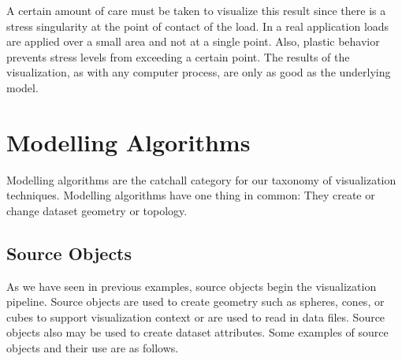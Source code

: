 A certain amount of care must be taken to visualize this result since there is a stress singularity at the point of contact of the load. In a real application loads are applied over a small area and not at a single point. Also, plastic behavior prevents stress levels from exceeding a certain point. The results of the visualization, as with any computer process, are only as good as the underlying model.

\section{Modelling Algorithms}

Modelling algorithms are the catchall category for our taxonomy of visualization techniques. Modelling algorithms have one thing in common: They create or change dataset geometry or topology.

\subsection{Source Objects}

As we have seen in previous examples, source objects begin the visualization pipeline. Source objects are used to create geometry such as spheres, cones, or cubes to support visualization context or are used to read in data files. Source objects also may be used to create dataset attributes. Some examples of source objects and their use are as follows.

